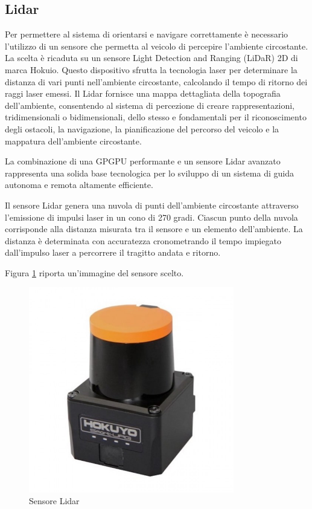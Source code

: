 \subsection{Lidar}
Per permettere al sistema di orientarsi e navigare correttamente è necessario l'utilizzo di un sensore che permetta al veicolo di percepire l'ambiente circostante. La scelta è ricaduta su un sensore Light Detection and Ranging (LiDaR) 2D di marca Hokuio. Questo dispositivo sfrutta la tecnologia laser per determinare la distanza di vari punti nell'ambiente circostante, calcolando il tempo di ritorno dei raggi laser emessi. Il Lidar fornisce una mappa dettagliata della topografia dell'ambiente, consentendo al sistema di percezione di creare rappresentazioni, tridimensionali o bidimensionali, dello stesso e fondamentali per il riconoscimento degli ostacoli, la navigazione, la pianificazione del percorso del veicolo e la mappatura dell'ambiente circostante.

\noindent La combinazione di una GPGPU performante e un sensore Lidar avanzato rappresenta una solida base tecnologica per lo sviluppo di un sistema di guida autonoma e remota altamente efficiente.

\noindent Il sensore Lidar genera una nuvola di punti dell'ambiente circostante attraverso l'emissione di impulsi laser in un cono di 270 gradi. Ciascun punto della nuvola corrisponde alla distanza misurata tra il sensore e un elemento dell'ambiente. La distanza è determinata con accuratezza cronometrando il tempo impiegato dall'impulso laser a percorrere il tragitto andata e ritorno.

Figura \ref{Sensore Lidar} riporta un'immagine del sensore scelto.

\begin{figure}[H]
  \centering
  \includegraphics[width=0.8\textwidth]{figures/sensore_hokuio.jpg}
  \caption{Sensore Lidar}
  \label{Sensore Lidar}
\end{figure}


